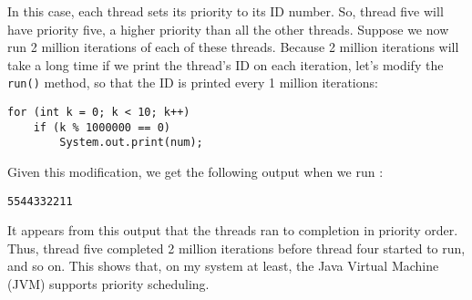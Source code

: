 \noindent In this case, each thread sets its priority to its ID number.
So, thread five will have priority five, a higher priority than
all the other threads.   Suppose we now run 2 million iterations of
each of these threads.  Because 2 million iterations will take a long
time if we print the thread's ID on each iteration, let's modify the
{\tt run()} method, so that the ID is printed every 1 million
iterations:

\begin{jjjlisting}
\begin{lstlisting}
for (int k = 0; k < 10; k++)
    if (k % 1000000 == 0)
        System.out.print(num);
\end{lstlisting}
\end{jjjlisting}

\noindent Given this modification, we get the following output when we
run :

\begin{jjjlisting}
\begin{lstlisting}
5544332211
\end{lstlisting}
\end{jjjlisting}

\noindent It appears from this output that the threads ran to completion
in priority order.  Thus, thread five completed 2 million iterations before
thread four started to run, and so on.  This shows that, on my system at
least, the Java Virtual Machine (JVM) supports priority scheduling.




